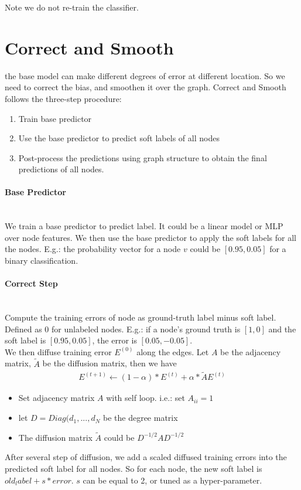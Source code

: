 Note we do not re-train the classifier. 
    
\section{Correct and Smooth}
the base model can make different degrees of error at different location. So we need to correct the bias, and smoothen it over the graph. Correct and Smooth follows the three-step procedure: 
    \begin{enumerate}
        \item Train base predictor
        \item Use the base predictor to predict soft labels of all nodes 
        \item Post-process the predictions using graph structure to obtain the final predictions of all nodes. 
    \end{enumerate}
    
\paragraph{Base Predictor}\mbox{}\\
We train a base predictor to predict label. It could be a linear model or MLP over node features. We then use the base predictor to apply the soft labels for all the nodes. E.g.: the probability vector for a node $v$ could be $[0.95, 0.05]$ for a binary classification. 

\paragraph{Correct Step} \mbox{}\\
Compute the training errors of node as ground-truth label minus soft label. Defined as 0 for unlabeled nodes. E.g.: if a node's ground truth is $[1,0]$ and the soft label is $[0.95, 0.05]$, the error is $[0.05, -0.05]$. \\

We then diffuse training error $E^{(0)}$ along the edges. Let $A$ be the adjacency matrix, $\tilde{A}$ be the diffusion matrix, then we have 
    \begin{align*}
        E^{(t+1)} \leftarrow (1 - \alpha) * E^{(t)} + \alpha * \tilde{A}E^{(t)}
    \end{align*}
    \begin{itemize}
        \item Set adjacency matrix $A$ with self loop. i.e.: set $A_{ii} = 1$
        \item let $D = Diag(d_1,...,d_N$ be the degree matrix 
        \item The diffusion matrix $\tilde{A}$ could be $D^{-1/2}AD^{-1/2}$
    \end{itemize}
After several step of diffusion, we add a scaled diffused training errors into the predicted soft label for all nodes. So for each node, the new soft label is $old_label + s * error$. $s$ can be equal to 2, or tuned as a hyper-parameter. 


